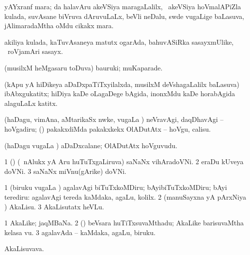 \bentry
{} 
\gl{\nA} 
\bmng
yAYxranf mara; \AseTxrXV da halavAru akeVSiya maragaLalilx, \kanmu\ akeVSiya hoVmalAPiZla kulada, suvAsane biVruva dAruvuLaLx, beVli neDalu, swde \mo vugaLige baLasuva, jAlimaradaMtha oMdu cikakx mara.
\emng
\eentry

\bentry
{} 
\gl{\nA} 
\bmng
akiliya kulada, kaTuvAsaneya matutx ogarAda, bahuvASiRka sasayxmUlike, \kanmu\ roVjamAri sasayx.
\emng
\eentry

\bentry
{} 
\gl{\nA} 
\bmng
(musilxM heMgasaru toDuva) bauruki; muKaparade.
\emng 
\eentry

\bentry
{} 
\gl{\nA}
\bmng
(kApu yA hiDikeya aDaDxpaTiTxyilalxda, musilxM deVshagaLalilx baLasuva) ibAbxgukatitx; hiDiya kaDe oLagaDege bAgida, inonxMdu kaDe horabAgida alaguLaLx katitx. 
\emng
\eentry

\bentry
{} 
\gl{\akirx} 
\bmng
(haDagu, vimAna, aMtarikaSx nwke, \mo vugaLa \vi) neVravAgi, daqDhavAgi -- hoVgadiru; (\kanmu) pakakxdiMda pakakxkekx OlADutAtx -- hoVgu, calisu.
\emng
\eentry

\bentry
{} 
\gl{\nA}
\bmng
(haDagu \mo vugaLa \vi) aDaDxcalane; OlADutAtx hoVguvudu.
\emng 
\eentry

\bentry
{} 
\gl{\nA}
\bmng
\bnum
\num{1} (\ca) (\kanmu\ nAlukx yA Aru huTuTxgaLiruva) saNaNx vihAradoVNi.
\num{2} eraDu kUveya doVNi. 
\num{3} saNaNx miVnu(gArike) doVNi. 
\enum
\emng
\eentry

\bentry
{}  
\gl{\akirx}
\bmng
\bnum
\num{1} (biruku \mo vugaLa \vi) agalavAgi biTuTxkoMDiru; bAyibiTuTxkoMDiru; bAyi terediru:   agalavAgi tereda kaMdaka, agaLu, kolilx. 
\num{2} (manuSayxna yA pArxNiya \vi) AkaLisu. 
\num{3} AkaLisutatx heVLu.
\enum
\emng
\eentry

\bentry
{} 
\gl{\nA} 
\bmng
\bnum
\num{1} AkaLike; jaqMBaNa. 
\num{2} (\AmA) beVsara huTiTxsuvaMthadu; AkaLike barisuvaMtha kelasa \mo vu. 
\num{3} agalavAda -- kaMdaka, agaLu, biruku.
\enum
\emng 
\eentry

\bentry
{} 
\gl{\nA} 
\bmng
AkaLisuvava.
\emng
\eentry

